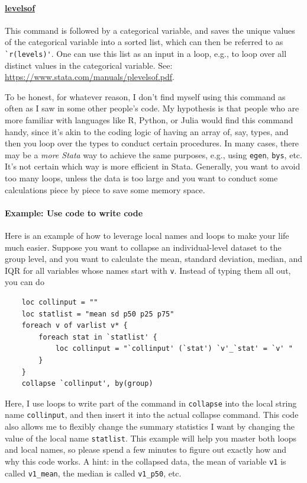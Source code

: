 \paragraph{\underline{levelsof}} This command is followed by a categorical variable, and saves the unique values of the categorical variable into a sorted list, which can then be referred to as \verb|`r(levels)'|. One can use this list as an input in a loop, e.g., to loop over all distinct values in the categorical variable. See: \url{https://www.stata.com/manuals/plevelsof.pdf}.

To be honest, for whatever reason, I don't find myself using this command as often as I saw in some other people's code. My hypothesis is that people who are more familiar with languages like R, Python, or Julia would find this command handy, since it's akin to the coding logic of having an array of, say, types, and then you loop over the types to conduct certain procedures. In many cases, there may be a \textit{more Stata} way to achieve the same purposes, e.g., using \verb|egen|, \verb|bys|, etc. It's not certain which way is more efficient in Stata. Generally, you want to avoid too many loops, unless the data is too large and you want to conduct some calculations piece by piece to save some memory space. 

\paragraph{Example: Use code to write code}
Here is an example of how to leverage local names and loops to make your life much easier. Suppose you want to collapse an individual-level dataset to the group level, and you want to calculate the mean, standard deviation, median, and IQR for all variables whose names start with \verb|v|. Instead of typing them all out, you can do
\begin{verbatim}
    loc collinput = ""
    loc statlist = "mean sd p50 p25 p75"
    foreach v of varlist v* {
        foreach stat in `statlist' {
            loc collinput = "`collinput' (`stat') `v'_`stat' = `v' "
        }
    }
    collapse `collinput', by(group)
\end{verbatim}
Here, I use loops to write part of the command in \verb|collapse| into the local string name \verb|collinput|, and then insert it into the actual collapse command. This code also allows me to flexibly change the summary statistics I want by changing the value of the local name \verb|statlist|. This example will help you master both loops and local names, so please spend a few minutes to figure out exactly how and why this code works. A hint: in the collapsed data, the mean of variable \verb|v1| is called \verb|v1_mean|, the median is called \verb|v1_p50|, etc. 

